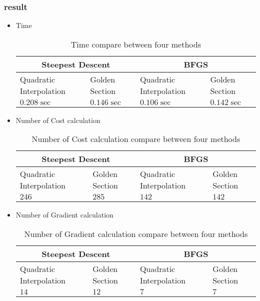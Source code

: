 \subsubsection{result}
\begin{itemize}
	\item Time
	\begin{table}[h]
		\caption {Time compare between four methods} 
		\begin{center}
			\begin{tabular}{ |l|l|l|l| }
				\hline
				\multicolumn{2}{|c|}{Steepest Descent} &
				\multicolumn{2}{|c|}{BFGS} \Tstrut\\
				\hline
				Quadratic Interpolation & Golden Section & Quadratic Interpolation &
				Golden Section \Tstrut\\
				\hline
				$0.208\sec$ & $0.146\sec$ & $0.106\sec$ & $0.142\sec$\Tstrut\\
				\hline
			\end{tabular}
		\end{center}
	\end{table}
	\item Number of Cost calculation
	\begin{table}[h]
		\caption {Number of Cost calculation compare between four methods} 
		\begin{center}
			\begin{tabular}{ |l|l|l|l| }
				\hline
				\multicolumn{2}{|c|}{Steepest Descent} &
				\multicolumn{2}{|c|}{BFGS} \Tstrut\\
				\hline
				Quadratic Interpolation & Golden Section & Quadratic Interpolation &
				Golden Section \Tstrut\\
				\hline
				$246$ & $285$ & $142$ & $142$\Tstrut\\
				\hline
			\end{tabular}
		\end{center}
	\end{table}
	\item Number of Gradient calculation
	\begin{table}[h]
		\caption {Number of Gradient calculation compare between four methods} 
		\begin{center}
			\begin{tabular}{ |l|l|l|l| }
				\hline
				\multicolumn{2}{|c|}{Steepest Descent} &
				\multicolumn{2}{|c|}{BFGS} \Tstrut\\
				\hline
				Quadratic Interpolation & Golden Section & Quadratic Interpolation &
				Golden Section \Tstrut\\
				\hline
				$14$ & $12$ & $7$ & $7$\Tstrut\\
				\hline
			\end{tabular}
		\end{center}
	\end{table}
\end{itemize}